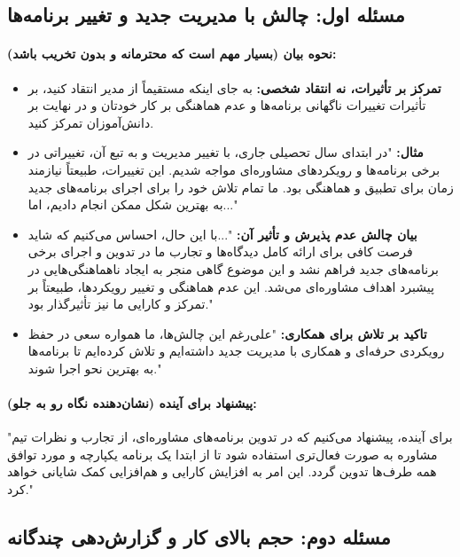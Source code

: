 \documentclass[12pt]{article}
\begin{document}
\subsection*{مسئله اول: چالش با مدیریت جدید و تغییر برنامه‌ها}

\paragraph{نحوه بیان (بسیار مهم است که محترمانه و بدون تخریب باشد):}
\begin{itemize}
    \item \textbf{تمرکز بر تأثیرات، نه انتقاد شخصی:} به جای اینکه مستقیماً از مدیر انتقاد کنید، بر تأثیرات تغییرات ناگهانی برنامه‌ها و عدم هماهنگی بر کار خودتان و در نهایت بر دانش‌آموزان تمرکز کنید.
    \item \textbf{مثال:} "در ابتدای سال تحصیلی جاری، با تغییر مدیریت و به تبع آن، تغییراتی در برخی برنامه‌ها و رویکردهای مشاوره‌ای مواجه شدیم. این تغییرات، طبیعتاً نیازمند زمان برای تطبیق و هماهنگی بود. ما تمام تلاش خود را برای اجرای برنامه‌های جدید به بهترین شکل ممکن انجام دادیم، اما..."
    \item \textbf{بیان چالش عدم پذیرش و تأثیر آن:} "...با این حال، احساس می‌کنیم که شاید فرصت کافی برای ارائه کامل دیدگاه‌ها و تجارب ما در تدوین و اجرای برخی برنامه‌های جدید فراهم نشد و این موضوع گاهی منجر به ایجاد ناهماهنگی‌هایی در پیشبرد اهداف مشاوره‌ای می‌شد. این عدم هماهنگی و تغییر رویکردها، طبیعتاً بر تمرکز و کارایی ما نیز تأثیرگذار بود."
    \item \textbf{تاکید بر تلاش برای همکاری:} "علی‌رغم این چالش‌ها، ما همواره سعی در حفظ رویکردی حرفه‌ای و همکاری با مدیریت جدید داشته‌ایم و تلاش کرده‌ایم تا برنامه‌ها به بهترین نحو اجرا شوند."
\end{itemize}

\paragraph{پیشنهاد برای آینده (نشان‌دهنده نگاه رو به جلو):}
"برای آینده، پیشنهاد می‌کنیم که در تدوین برنامه‌های مشاوره‌ای، از تجارب و نظرات تیم مشاوره به صورت فعال‌تری استفاده شود تا از ابتدا یک برنامه یکپارچه و مورد توافق همه طرف‌ها تدوین گردد. این امر به افزایش کارایی و هم‌افزایی کمک شایانی خواهد کرد."

\subsection*{مسئله دوم: حجم بالای کار و گزارش‌دهی چندگانه}
\end{document}
